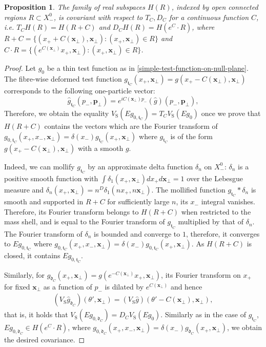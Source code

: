 \documentclass[12pt]{article}
\def\tp{\pmb{p}}
\newtheorem{proposition}[theorem]{Proposition}
\theoremstyle{remark}
\begin{document}
\begin{proposition}\label{pr:null-covariance}
The family of real subspaces $H(R)$, indexed by open connected regions $R\subset X_-^0$, is covariant with respect to
$T_C, D_C$ for a continuous function $C$,
i.e.\! $T_C H(R) = H(R+C)$ and $D_{C} H(R) = H(e^{C}\cdot R)$,
where $R + C = \{(x_+ + C(\pmb{x}_\perp), \pmb{x}_\perp): (x_+, \pmb{x}_\perp) \in R\}$
and $C\cdot R = \{(e^{C(\pmb{x}_\perp)}x_+, \pmb{x}_\perp): (x_+, \pmb{x}_\perp) \in R\}$.
\end{proposition}
\begin{proof}
 Let $g_0$ be a thin test function as in \eqref{simple-test-function-on-null-plane}.
 The fibre-wise deformed test function $g_{\mathfrak{t}_C}(x_+, \pmb{x}_\perp) = g(x_+ - C(\pmb{x}_\perp), \pmb{x}_\perp)$
 corresponds to the following one-particle vector:
 \[
  \hat g_{\mathfrak{t}_C}(p_-, \tp_\perp) = e^{iC(\pmb{x}_\perp)p_-}(\hat g)(p_-, \tp_\perp),
 \]
 Therefore, we obtain the equality $ V_{\mathrm S}(E g_{0,\mathfrak{t}_C})=T_CV_{\mathrm S}(Eg_0) $
 once we prove that $H(R+C)$ contains the vectors which are the Fourier transform
 of $g_{0,\mathfrak{t}_C}(x_+, x_-, \pmb{x}_\perp) = \delta(x_-)g_{\mathfrak{t}_C}(x_+, \pmb{x}_\perp)$
 where $g_{\mathfrak{t}_C}$ is of the form $g(x_+ - C(\pmb{x}_\perp), \pmb{x}_\perp)$
 with a smooth $g$.

 Indeed, we can mollify $g_{\mathfrak{t}_C}$ by an approximate delta function $\delta_n$ on $X_-^0$:
 $\delta_n$ is a positive smooth function with $\int \delta_1(x_+,\pmb{x}_\perp) dx_+ d\pmb{x}_\perp = 1$
 over the Lebesgue measure and $\delta_n(x_+,\pmb{x}_\perp) = n^D \delta_1(nx_+, n\pmb{x}_\perp)$.
 The mollified function $g_{\mathfrak{t}_C} * \delta_n$ is smooth and supported in $R+C$ for sufficiently large $n$,
 its $x_-$ integral vanishes.
 Therefore, its Fourier transform belongs to $H(R+C)$ when restricted to the mass shell,
 and is equal to the Fourier transform of $g_{\mathfrak{t}_C}$ multiplied by that of $\delta_n$. 
 The Fourier transform of $\delta_n$ is bounded and converge to $1$, therefore, it converges to $Eg_{0,\mathfrak{t}_C}$
 where $g_{0,\mathfrak{t}_C}(x_+, x_-, \pmb{x}_\perp) = \delta(x_-)g_{0,\mathfrak{t}_C}(x_+, \pmb{x}_\perp)$.
 As $H(R+C)$ is closed, it contains $Eg_{0,\mathfrak{t}_C}$.
 
 
 
Similarly, for $g_{\mathfrak{d}_{C}}(x_+, \pmb{x}_\perp) = g(e^{-C(\pmb{x}_\perp)}x_+ , \pmb{x}_\perp)$,
 its Fourier transform on $x_+$ for fixed $\pmb{x}_\perp$ as a function of $p_-$ is dilated by $e^{C(\pmb{x}_\perp)}$ and hence
 \begin{align*}
  (V_{\mathrm S}\hat g_{\mathfrak{d}_{C}})(\theta', \pmb{x}_\perp)
  = (V_{\mathrm S}\hat g)(\theta'-C(\pmb{x}_\perp), \pmb{x}_\perp),
 \end{align*}
 that is, it holds that $V_{\mathrm S}(Eg_{0,\mathfrak{d}_{C}}) = D_{C} V_{\mathrm S}(Eg_0)$.
 Similarly as in the case of $g_{\mathfrak{t}_C}$, $Eg_{0,\mathfrak{d}_C} \in H(e^{C}\cdot R)$,
 where $g_{0,\mathfrak{d}_C}(x_+, x_-, \pmb{x}_\perp) = \delta(x_-)g_{\mathfrak{d}_{C}}(x_+, \pmb{x}_\perp)$,
 we obtain the desired covariance.

\end{proof}
\end{document}
